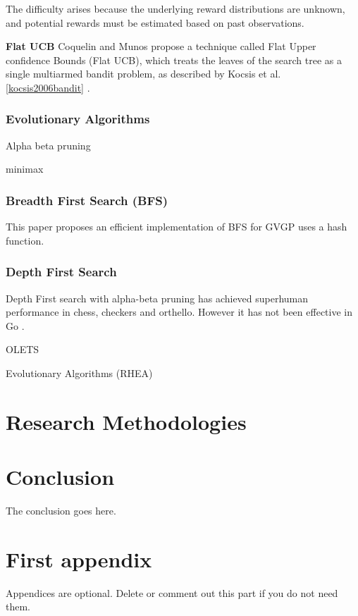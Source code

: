 \documentclass[journal]{IEEEtran}
\begin{document}
				The difficulty arises because the underlying reward distributions are unknown, and potential rewards must be estimated based on past observations.
			
			\textbf{Flat UCB}
				Coquelin and Munos propose a technique called Flat Upper confidence Bounds (Flat UCB), which treats the leaves of the search tree as a single multiarmed bandit problem, as described by Kocsis et al. \ref{kocsis2006bandit} .

			

		








		\subsubsection{Evolutionary Algorithms} \label{sssec:num2}

		
		
		Alpha beta pruning
		
		minimax
		
		\subsubsection{Breadth First Search (BFS) }\label{sssec:BFS}
		This paper proposes an efficient implementation of BFS for GVGP \cite{EfficientBFS} uses a hash function.
		
		\subsubsection{Depth First Search}

		Depth First search with alpha-beta pruning \cite{knuth1975analysis} has achieved superhuman performance in chess, checkers and orthello. However it has not been effective in Go \cite{silver2016mastering}.
		
		
		OLETS
		
		
		Evolutionary Algorithms
		(RHEA)
		
		
	
\section{Research Methodologies}	

	
		
		


\section{Conclusion}
The conclusion goes here.






\appendices
\section{First appendix}
Appendices are optional. Delete or comment out this part if you do not need them.

\end{document}
